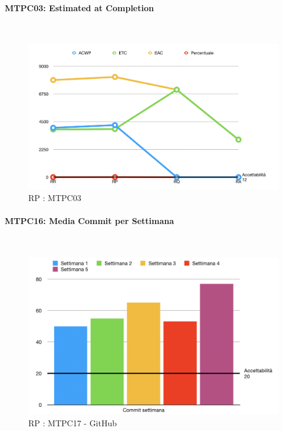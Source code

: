 \pagebreak

\paragraph{MTPC03: Estimated at Completion}\-\\
\begin{figure}[H]
	\begin{center}
		\includegraphics[scale=0.5]{./images/grafici_RP/MTPC03.png} 
	\end{center}
	\caption{RP : MTPC03}
\end{figure}

\paragraph{MTPC16: Media Commit per Settimana}\-\\
\begin{figure}[H]
	\begin{center}
		\includegraphics[scale=0.5]{./images/grafici_RP/commitGithub.png} 
	\end{center}
	\caption{RP : MTPC17 - GitHub}
\end{figure}

